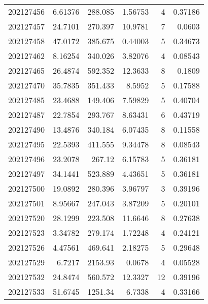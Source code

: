 \begin{tabular}{rrrrrr}
 202127456 &          6.61376 &      288.085  &            1.56753 &           4 & 0.37186 \\
 202127457 &         24.7101  &      270.397  &           10.9781  &           7 & 0.0603  \\
 202127458 &         47.0172  &      385.675  &            0.44003 &           5 & 0.34673 \\
 202127462 &          8.16254 &      340.026  &            3.82076 &           4 & 0.08543 \\
 202127465 &         26.4874  &      592.352  &           12.3633  &           8 & 0.1809  \\
 202127470 &         35.7835  &      351.433  &            8.5952  &           5 & 0.17588 \\
 202127485 &         23.4688  &      149.406  &            7.59829 &           5 & 0.40704 \\
 202127487 &         22.7854  &      293.767  &            8.63431 &           6 & 0.43719 \\
 202127490 &         13.4876  &      340.184  &            6.07435 &           8 & 0.11558 \\
 202127495 &         22.5393  &      411.555  &            9.34478 &           8 & 0.08543 \\
 202127496 &         23.2078  &      267.12   &            6.15783 &           5 & 0.36181 \\
 202127497 &         34.1441  &      523.889  &            4.43651 &           5 & 0.36181 \\
 202127500 &         19.0892  &      280.396  &            3.96797 &           3 & 0.39196 \\
 202127501 &          8.95667 &      247.043  &            3.87209 &           5 & 0.20101 \\
 202127520 &         28.1299  &      223.508  &           11.6646  &           8 & 0.27638 \\
 202127523 &          3.34782 &      279.174  &            1.72248 &           4 & 0.24121 \\
 202127526 &          4.47561 &      469.641  &            2.18275 &           5 & 0.29648 \\
 202127529 &          6.7217  &     2153.93   &            0.0678  &           4 & 0.05528 \\
 202127532 &         24.8474  &      560.572  &           12.3327  &          12 & 0.39196 \\
 202127533 &         51.6745  &     1251.34   &            6.7338  &           4 & 0.33166 \\

\end{tabular}
